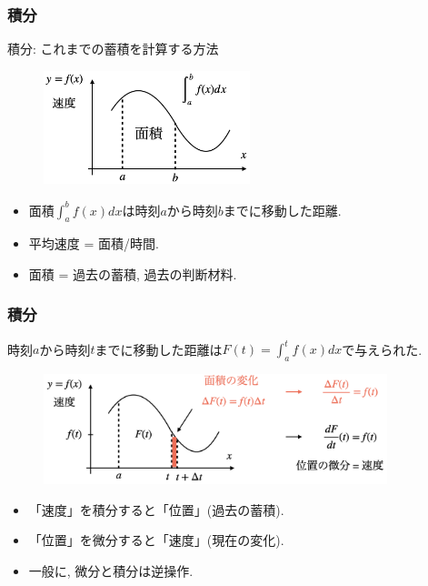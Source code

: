 

\begin{frame}
\frametitle{積分}

積分: これまでの蓄積を計算する方法

 \begin{figure}[htbp]
 \begin{center} 
  \includegraphics[width=60mm]{calculus1/int_speed.png}
 \end{center}
\end{figure}


\begin{itemize}
\item 面積$\int_a^b f(x)dx$は時刻$a$から時刻$b$までに移動した距離. 
\item 平均速度 = 面積/時間. 
\item 面積 = 過去の蓄積, 過去の判断材料.
\end{itemize}

\end{frame}




\begin{frame}
\frametitle{積分}

時刻$a$から時刻$t$までに移動した距離は$F(t)=\int_a^tf(x)dx$で与えられた. 

 \begin{figure}[htbp]
 \begin{center} 
  \includegraphics[width=100mm]{calculus1/diff_pos=speed.png}
 \end{center}
\end{figure}


\begin{itemize}
\item 「速度」を積分すると「位置」(過去の蓄積). 
\item 「位置」を微分すると「速度」(現在の変化). 
\item  一般に, 微分と積分は逆操作. 
\end{itemize}

\end{frame}



